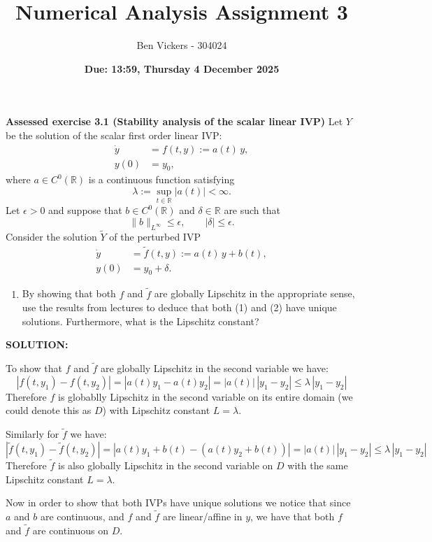 \documentclass[]{article}
\title{\textbf{Numerical Analysis Assignment 3}}
\author{Ben Vickers - 304024}
\date{\textbf{Due: 13:59, Thursday 4 December 2025}}
\begin{document}
	\maketitle
\noindent\textbf{Assessed exercise 3.1 (Stability analysis of the scalar linear IVP)} Let $Y$ be the solution of the scalar first order linear IVP:
\[
\begin{aligned}
\dot y &= f(t,y) := a(t)\,y,\\ y(0)&=y_0,
\end{aligned}\tag{1}
\]
where $a\in C^0(\mathbb{R})$ is a continuous function satisfying
\[
\lambda := \sup_{t\in\mathbb{R}} |a(t)| < \infty.
\]
Let $\epsilon>0$ and suppose that $b\in C^0(\mathbb{R})$ and $\delta\in\mathbb{R}$ are such that
\[
\|b\|_{L^\infty}\le \epsilon,\qquad |\delta|\le \epsilon.
\]
Consider the solution $\tilde Y$ of the perturbed IVP
\[
\begin{aligned}
    \dot y &= \tilde f(t,y) := a(t)\,y + b(t),\\ y(0)&=y_0+\delta.\end{aligned}
 \tag{2}
\]
\begin{enumerate}
\item By showing that both $f$ and $\tilde f$ are globally Lipschitz in the appropriate sense, use the results from lectures to deduce that both \textup{(1)} and \textup{(2)} have unique solutions. Furthermore, what is the Lipschitz constant?
\end{enumerate}

\noindent \textbf{SOLUTION:} \newline

\noindent To show that $f$ and $\tilde{f}$ are globally Lipschitz in the second variable we have:
\[
|f(t,y_1)-f(t,y_2)|
= |a(t)y_1 - a(t)y_2|
= |a(t)|\,|y_1-y_2|
\leq \lambda\,|y_1-y_2|
\]
\noindent Therefore $f$ is globablly Lipschitz in the second variable on its entire domain (we could denote this as $D$) with Lipschitz constant $L = \lambda$.\newline

\noindent Similarly for $\tilde{f}$ we have:
\[
|\tilde f(t,y_1)-\tilde f(t,y_2)|
= |a(t)y_1 + b(t) - (a(t)y_2 + b(t))|
= |a(t)|\,|y_1-y_2|
\leq \lambda\,|y_1-y_2|
\]
\noindent Therefore $\tilde f$ is also globally Lipschitz in the second variable on $D$ with the same Lipschitz constant $L = \lambda$.\newline


\noindent Now in order to show that both IVPs have unique solutions we notice that since $a$ and $b$ are continuous, and $f$ and $\tilde{f}$ are linear/affine in $y$, we have that both $f$ and $\tilde f$ are continuous on $D$.\newline
\end{document}
